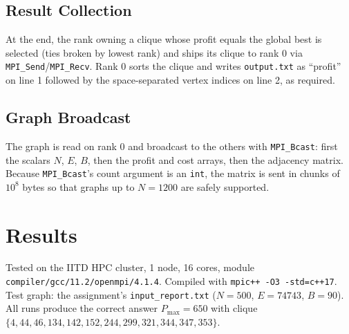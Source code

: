 \documentclass[11pt]{article}
\begin{document}
\subsection{Result Collection}
At the end, the rank owning a clique whose profit equals the global best is selected (ties broken by lowest rank) and ships its clique to rank 0 via \texttt{MPI\_Send}/\texttt{MPI\_Recv}. Rank 0 sorts the clique and writes \texttt{output.txt} as ``profit'' on line 1 followed by the space-separated vertex indices on line 2, as required.

\subsection{Graph Broadcast}
The graph is read on rank 0 and broadcast to the others with \texttt{MPI\_Bcast}: first the scalars $N$, $E$, $B$, then the profit and cost arrays, then the adjacency matrix. Because \texttt{MPI\_Bcast}'s count argument is an \texttt{int}, the matrix is sent in chunks of $10^8$ bytes so that graphs up to $N{=}1200$ are safely supported.

\section{Results}

Tested on the IITD HPC cluster, 1 node, 16 cores, module \texttt{compiler/gcc/11.2/openmpi/4.1.4}. Compiled with \texttt{mpic++ -O3 -std=c++17}. Test graph: the assignment's \texttt{input\_report.txt} ($N=500$, $E=74743$, $B=90$). All runs produce the correct answer $P_{\max}=650$ with clique $\{4,44,46,134,142,152,244,299,321,344,347,353\}$.
\end{document}
